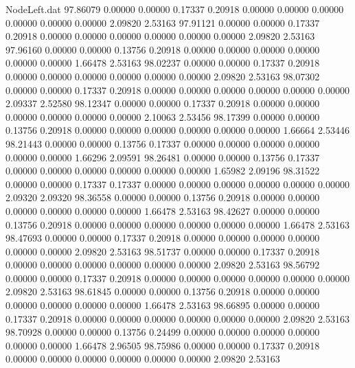 \begin{filecontents}{NodeLeft.dat}
  97.86079    0.00000    0.00000     0.17337    0.20918    0.00000    0.00000    0.00000    0.00000    0.00000    0.00000    2.09820    2.53163
  97.91121    0.00000    0.00000     0.17337    0.20918    0.00000    0.00000    0.00000    0.00000    0.00000    0.00000    2.09820    2.53163
  97.96160    0.00000    0.00000     0.13756    0.20918    0.00000    0.00000    0.00000    0.00000    0.00000    0.00000    1.66478    2.53163
  98.02237    0.00000    0.00000     0.17337    0.20918    0.00000    0.00000    0.00000    0.00000    0.00000    0.00000    2.09820    2.53163
  98.07302    0.00000    0.00000     0.17337    0.20918    0.00000    0.00000    0.00000    0.00000    0.00000    0.00000    2.09337    2.52580
  98.12347    0.00000    0.00000     0.17337    0.20918    0.00000    0.00000    0.00000    0.00000    0.00000    0.00000    2.10063    2.53456
  98.17399    0.00000    0.00000     0.13756    0.20918    0.00000    0.00000    0.00000    0.00000    0.00000    0.00000    1.66664    2.53446
  98.21443    0.00000    0.00000     0.13756    0.17337    0.00000    0.00000    0.00000    0.00000    0.00000    0.00000    1.66296    2.09591
  98.26481    0.00000    0.00000     0.13756    0.17337    0.00000    0.00000    0.00000    0.00000    0.00000    0.00000    1.65982    2.09196
  98.31522    0.00000    0.00000     0.17337    0.17337    0.00000    0.00000    0.00000    0.00000    0.00000    0.00000    2.09320    2.09320
  98.36558    0.00000    0.00000     0.13756    0.20918    0.00000    0.00000    0.00000    0.00000    0.00000    0.00000    1.66478    2.53163
  98.42627    0.00000    0.00000     0.13756    0.20918    0.00000    0.00000    0.00000    0.00000    0.00000    0.00000    1.66478    2.53163
  98.47693    0.00000    0.00000     0.17337    0.20918    0.00000    0.00000    0.00000    0.00000    0.00000    0.00000    2.09820    2.53163
  98.51737    0.00000    0.00000     0.17337    0.20918    0.00000    0.00000    0.00000    0.00000    0.00000    0.00000    2.09820    2.53163
  98.56792    0.00000    0.00000     0.17337    0.20918    0.00000    0.00000    0.00000    0.00000    0.00000    0.00000    2.09820    2.53163
  98.61845    0.00000    0.00000     0.13756    0.20918    0.00000    0.00000    0.00000    0.00000    0.00000    0.00000    1.66478    2.53163
  98.66895    0.00000    0.00000     0.17337    0.20918    0.00000    0.00000    0.00000    0.00000    0.00000    0.00000    2.09820    2.53163
  98.70928    0.00000    0.00000     0.13756    0.24499    0.00000    0.00000    0.00000    0.00000    0.00000    0.00000    1.66478    2.96505
  98.75986    0.00000    0.00000     0.17337    0.20918    0.00000    0.00000    0.00000    0.00000    0.00000    0.00000    2.09820    2.53163

\end{filecontents}
